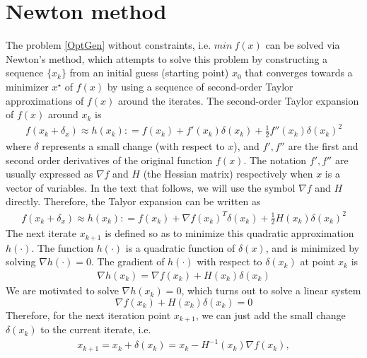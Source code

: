 	\section{Newton method}
	The problem \ref{OptGen} without constraints, i.e. $min \  f(x)$  can be solved via Newton's method, which attempts to solve this problem by constructing a sequence $\{x_k\}$ from an initial guess (starting point) $x_0$ that converges towards a minimizer $x^\star$ of $f(x)$  by using a sequence of second-order Taylor approximations of $f(x)$ around the iterates. The second-order Taylor expansion of $f(x)$ around $x_k$ is
	\begin{align*}
		f(x_k + \delta_x) \approx h(x_k) : = f(x_k) + f'(x_k)\delta(x_k) +\frac{1}{2}f''(x_k)\delta(x_k)^2 
	\end{align*}
	where $\delta$ represents a small change (with respect to $x$), and $f', f''$ are the first and second order derivatives of the original function $f(x)$. The notation $f', f''$ are usually expressed as $\nabla f$ and  $H$ (the Hessian matrix) respectively when $x$ is a vector of variables. In the text that follows, we will use the symbol $\nabla f$ and $H$ directly. Therefore, the Talyor expansion can be written as 
	\begin{align*}
		f(x_k + \delta_x) \approx h(x_k) : = f(x_k) + \nabla f(x_k)^T\delta(x_k) +\frac{1}{2}H(x_k)\delta(x_k)^2 
	\end{align*}
	The next iterate $x_{k+1}$ is defined so as to minimize this quadratic approximation $h(\cdot)$. The function $h(\cdot)$ is a quadratic function of $\delta(x)$, and is minimized by solving $\nabla h(\cdot) = 0$. The gradient of $h(\cdot)$ with respect to $\delta(x_k)$ at point $x_k$ is
	\begin{align*}
		\nabla h(x_k) = \nabla f(x_k) + H(x_k) \delta(x_k) 
	\end{align*}
	We are motivated to solve $\nabla h(x_k) =0$, which turns out to solve a linear system
	\begin{equation}
		\nabla f(x_k) + H(x_k) \delta(x_k) =0
		\label{HessianEq}
	\end{equation}
	Therefore, for the next iteration point $x_{k+1}$, we can just add the small change $\delta(x_k)$ to the current iterate, i.e. 
	\begin{align*}
		x_{k+1}  = x_k + \delta(x_k) = x_k - H^{-1}(x_k)\nabla f(x_k), 
	\end{align*}
